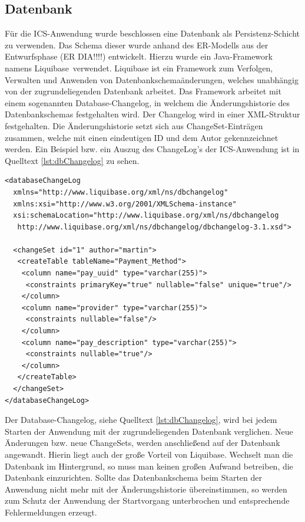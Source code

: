 	\subsection{Datenbank} \label{umsetzung:backend:datenbank}
	Für die \ac{ICS}-Anwendung wurde beschlossen eine Datenbank als Persistenz-Schicht zu verwenden. Das Schema dieser wurde anhand des ER-Modells aus der Entwurfsphase (ER DIA!!!!) entwickelt. Hierzu wurde ein Java-Framework namens \glqq Liquibase\grqq \, verwendet.\autocite{Liquibase} Liquibase ist ein Framework zum Verfolgen, Verwalten und Anwenden von Datenbankschemaänderungen, welches unabhängig von der zugrundeliegenden Datenbank arbeitet. Das Framework arbeitet mit einem sogenannten \glqq Database-Changelog\grqq, in welchem die Änderungshistorie des Datenbankschemas festgehalten wird. Der Changelog wird in einer XML-Struktur festgehalten. Die Änderungshistorie setzt sich aus \glqq ChangeSet\grqq-Einträgen zusammen, welche mit einen eindeutigen \ac{ID} und dem Autor gekennzeichnet werden. Ein Beispiel bzw. ein Auszug des ChangeLog's der \ac{ICS}-Anwendung ist in Quelltext \ref{lst:dbChangelog} zu sehen.
	
\begin{lstlisting}[caption={Database-Changelog Liquibase}, label={lst:dbChangelog}]
<databaseChangeLog
  xmlns="http://www.liquibase.org/xml/ns/dbchangelog"
  xmlns:xsi="http://www.w3.org/2001/XMLSchema-instance"
  xsi:schemaLocation="http://www.liquibase.org/xml/ns/dbchangelog   
   http://www.liquibase.org/xml/ns/dbchangelog/dbchangelog-3.1.xsd">
  
  <changeSet id="1" author="martin">
   <createTable tableName="Payment_Method">
    <column name="pay_uuid" type="varchar(255)">
     <constraints primaryKey="true" nullable="false" unique="true"/>
    </column>
    <column name="provider" type="varchar(255)">
     <constraints nullable="false"/>
    </column>
    <column name="pay_description" type="varchar(255)">
     <constraints nullable="true"/>
    </column>
   </createTable>
  </changeSet>
</databaseChangeLog>
\end{lstlisting}

	Der Database-Changelog, siehe Quelltext \ref{lst:dbChangelog}, wird bei jedem Starten der Anwendung mit der zugrundeliegenden Datenbank verglichen. Neue Änderungen bzw. neue ChangeSets, werden anschließend auf der Datenbank angewandt. Hierin liegt auch der große Vorteil von Liquibase. Wechselt man die Datenbank im Hintergrund, so muss man keinen großen Aufwand betreiben, die Datenbank einzurichten. Sollte das Datenbankschema beim Starten der Anwendung nicht mehr mit der Änderungshistorie übereinstimmen, so werden zum Schutz der Anwendung der Startvorgang unterbrochen und entsprechende Fehlermeldungen erzeugt.
	
